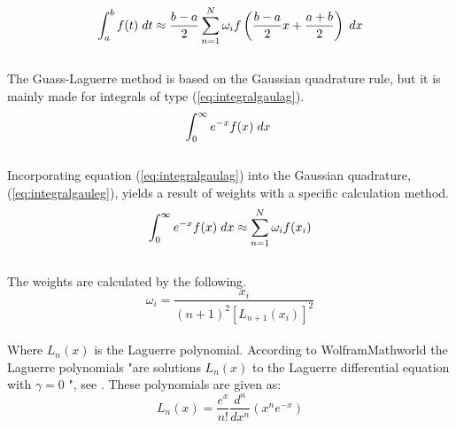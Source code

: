 \documentclass{article}
\begin{document}
\begin{equation} \label{eq:finalintegralgauleg}
    \int_{a}^{b} f(t) \hspace{1mm} dt \approx \frac{b-a}{2} \sum_{n=1}^{N} \omega_i f \left( \frac{b-a}{2}x + \frac{a+b}{2} \right) \hspace{1mm} dx
\end{equation} \\

The Guass-Laguerre method is based on the Gaussian quadrature rule, but it is mainly made for integrals of type (\ref{eq:integralgaulag}). \\

\begin{equation} \label{eq:integralgaulag}
    \int_{0}^{\infty} e^{-x} f(x) \hspace{1mm} dx \hspace{1mm}
\end{equation} \\

Incorporating equation (\ref{eq:integralgaulag}) into the Gaussian quadrature, (\ref{eq:integralgauleg}), yields a result of weights with a specific calculation method. \\

\begin{equation} \label{eq:fullintegralgaulag}
    \int_{0}^{\infty} e^{-x} f(x) \hspace{1mm} dx \approx \sum_{n=1}^{N} \omega_i f(x_i)
\end{equation} \\

The weights are calculated by the following. \\

\begin{equation} \label{eq:weightsgaulag}
    \omega_i = \frac{x_i}{(n+1)^2 [L_{n+1}(x_i)]^2}
\end{equation} \\

Where $L_n(x)$ is the Laguerre polynomial. According to WolframMathworld the Laguerre polynomials "are solutions $L_n(x)$ to the Laguerre differential equation with $\gamma=0$ ", see \cite{laguerre_polynomial}. These polynomials are given as: \\

\begin{equation}
    L_n(x) = \frac{e^x}{n!}\frac{d^n}{dx^n}(x^n e^{-x})
\end{equation} \\
\end{document}
